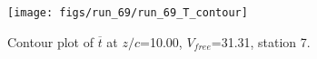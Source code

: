 \begin{figure}[H]
\centering
\texttt{[image: figs/run\_69/run\_69\_T\_contour]}
\caption{Contour plot of $\overline{t}$ at $z/c$=10.00, $V_{free}$=31.31, station 7.}
\end{figure}


